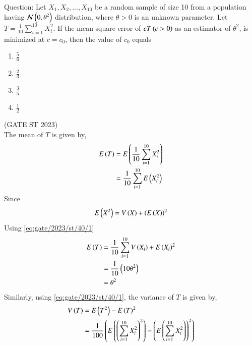 \documentclass[journal,12pt,onecolumn]{IEEEtran}
\theoremstyle{remark}
\begin{document}
%
Question:
Let $X_1, X_2, ..., X_{10}$ be a random sample of size 10 from a population having $\mathcal{N}\left(0,\theta^2\right)$ distribution, where $\theta > 0$ is an unknown parameter.
Let $T = \frac{1}{10}\sum^{10}_{i=1}{X_i^2}$. If the mean square error of $cT \left(c > 0\right)$ as an estimator of $\theta^2$, is minimized at $c = c_0$, then the value of $c_0$ equals
\begin{enumerate}[label =(\roman*)]
	\item $\frac{5}{6}$ \vspace{2pt}
	\item $\frac{2}{3}$ \vspace{2pt}
	\item $\frac{3}{5}$ \vspace{2pt}
	\item $\frac{1}{2}$ \vspace{2pt}
\end{enumerate}
\hfill{(GATE ST 2023)}
\\
\solution
The mean of $T$ is given by,
\begin{align}
	E\left(T\right) &= E\left(\frac{1}{10}\sum^{10}_{i=1}{X_i^2}\right)\\
	&= \frac{1}{10}\sum^{10}_{i=1}{E\left(X_i^2\right)}
\end{align}
Since
\begin{align}
	E\left(X^2\right) = V\left(X\right) + \left(E\left(X\right)\right)^2 \label{eq:gate/2023/st/40/1}
\end{align}
Using \eqref{eq:gate/2023/st/40/1}
\begin{align}
	E\left(T\right) &= \frac{1}{10}\sum^{10}_{i=1}{V\left(X_i\right) + E\left(X_i\right)^2}\\
	&= \frac{1}{10}\left(10\theta^2\right)\\
	&= \theta^2
\end{align}
Similarly, using \eqref{eq:gate/2023/st/40/1}, the variance of $T$ is given by,
\begin{align}
	V\left(T\right) &= E\left(T^2\right) - E\left(T\right)^2\\
	&= \frac{1}{100}\left(E\left(\left(\sum^{10}_{i=1}{X_i^2}\right)^2\right) - \left(E\left(\sum^{10}_{i=1}{X_i^2}\right)\right)^2\right)
\end{align}
\end{document}
